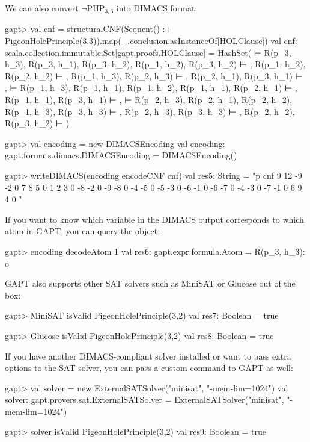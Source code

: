 \documentclass[a4paper,11pt]{book}
\newcommand{\cli}[1]{{\ttfamily {#1}}}
\begin{document}
We can also convert $\neg\mathrm{PHP}_{3,3}$ into DIMACS format:
\begin{clilisting}
gapt> val cnf = structuralCNF(Sequent() :+ PigeonHolePrinciple(3,3)).map(_.conclusion.asInstanceOf[HOLClause])
val cnf: scala.collection.immutable.Set[gapt.proofs.HOLClause] = HashSet( ⊢ R(p_3, h_3), R(p_3, h_1), R(p_3, h_2), R(p_1, h_2), R(p_3, h_2) ⊢ , R(p_1, h_2), R(p_2, h_2) ⊢ , R(p_1, h_3), R(p_2, h_3) ⊢ , R(p_2, h_1), R(p_3, h_1) ⊢ ,  ⊢ R(p_1, h_3), R(p_1, h_1), R(p_1, h_2), R(p_1, h_1), R(p_2, h_1) ⊢ , R(p_1, h_1), R(p_3, h_1) ⊢ ,  ⊢ R(p_2, h_3), R(p_2, h_1), R(p_2, h_2), R(p_1, h_3), R(p_3, h_3) ⊢ , R(p_2, h_3), R(p_3, h_3) ⊢ , R(p_2, h_2), R(p_3, h_2) ⊢ )

gapt> val encoding = new DIMACSEncoding
val encoding: gapt.formats.dimacs.DIMACSEncoding = DIMACSEncoding()

gapt> writeDIMACS(encoding encodeCNF cnf)
val res5: String =
"p cnf 9 12
-9 -2 0
7 8 5 0
1 2 3 0
-8 -2 0
-9 -8 0
-4 -5 0
-5 -3 0
-6 -1 0
-6 -7 0
-4 -3 0
-7 -1 0
6 9 4 0
"

\end{clilisting}

If you want to know which variable in the DIMACS output corresponds to which
atom in GAPT, you can query the \cli{DIMACSEncoding} object:
\begin{clilisting}
gapt> encoding decodeAtom 1
val res6: gapt.expr.formula.Atom = R(p_3, h_3): o

\end{clilisting}

GAPT also supports other SAT solvers such as MiniSAT or Glucose out of the box:
\begin{clilisting}
gapt> MiniSAT isValid PigeonHolePrinciple(3,2)
val res7: Boolean = true

\end{clilisting}
\begin{clilisting}
gapt> Glucose isValid PigeonHolePrinciple(3,2)
val res8: Boolean = true

\end{clilisting}

If you have another DIMACS-compliant solver installed or want to pass extra
options to the SAT solver, you can pass a custom command to GAPT as well:
\begin{clilisting}
gapt> val solver = new ExternalSATSolver("minisat", "-mem-lim=1024")
val solver: gapt.provers.sat.ExternalSATSolver = ExternalSATSolver("minisat", "-mem-lim=1024")

gapt> solver isValid PigeonHolePrinciple(3,2)
val res9: Boolean = true

\end{clilisting}
\end{document}
